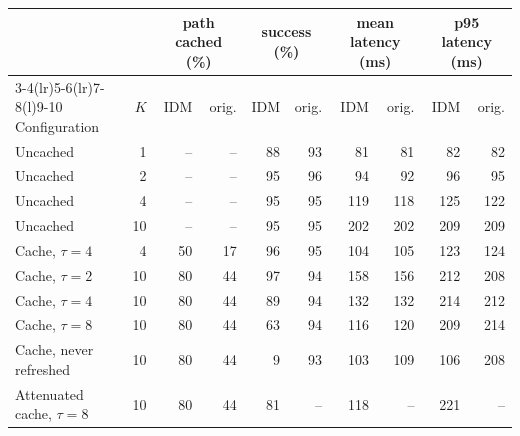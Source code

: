 \begin{tabular}{@{}lrrrrrrrrr@{}}
\toprule
 & & \multicolumn{2}{c}{path cached (\%)} & \multicolumn{2}{c}{success (\%)} & \multicolumn{2}{c}{mean latency (ms)} & \multicolumn{2}{c}{p95 latency (ms)} \\
\cmidrule(lr){3-4}\cmidrule(lr){5-6}\cmidrule(lr){7-8}\cmidrule(l){9-10}
Configuration & $K$ & IDM & orig. & IDM & orig. & IDM & orig. & IDM & orig. \\
\midrule
Uncached & 1 & -- & -- & 88 & 93 & 81 & 81 & 82 & 82 \\
Uncached & 2 & -- & -- & 95 & 96 & 94 & 92 & 96 & 95 \\
Uncached & 4 & -- & -- & 95 & 95 & 119 & 118 & 125 & 122 \\
Uncached & 10 & -- & -- & 95 & 95 & 202 & 202 & 209 & 209 \\
\midrule
Cache, $\tau{=}4$ & 4 & 50 & 17 & 96 & 95 & 104 & 105 & 123 & 124 \\
Cache, $\tau{=}2$ & 10 & 80 & 44 & 97 & 94 & 158 & 156 & 212 & 208 \\
Cache, $\tau{=}4$ & 10 & 80 & 44 & 89 & 94 & 132 & 132 & 214 & 212 \\
Cache, $\tau{=}8$ & 10 & 80 & 44 & 63 & 94 & 116 & 120 & 209 & 214 \\
Cache, never refreshed & 10 & 80 & 44 & 9 & 93 & 103 & 109 & 106 & 208 \\
Attenuated cache, $\tau{=}8$ & 10 & 80 & 44 & 81 & -- & 118 & -- & 221 & -- \\
\bottomrule
\end{tabular}

